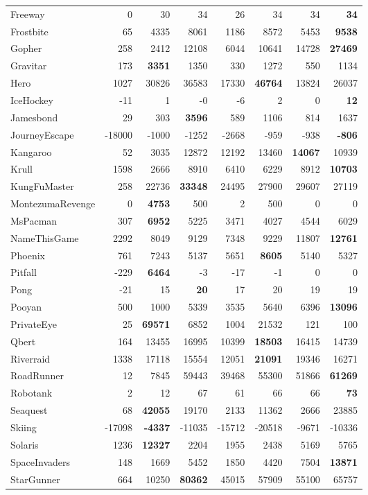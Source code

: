 \documentclass{article}
\begin{document}
\begin{table}
\begin{tabular}{l r r r r r r r}
Freeway&0&30&34&26&34&34&\textbf{34}\\
Frostbite&65&4335&8061&1186&8572&5453&\textbf{9538}\\
Gopher&258&2412&12108&6044&10641&14728&\textbf{27469}\\
Gravitar&173&\textbf{3351}&1350&330&1272&550&1134\\
Hero&1027&30826&36583&17330&\textbf{46764}&13824&26037\\
IceHockey&-11&1&-0&-6&2&0&\textbf{12}\\
Jamesbond&29&303&\textbf{3596}&589&1106&814&1637\\
JourneyEscape&-18000&-1000&-1252&-2668&-959&-938&\textbf{-806}\\
Kangaroo&52&3035&12872&12192&13460&\textbf{14067}&10939\\
Krull&1598&2666&8910&6410&6229&8912&\textbf{10703}\\
KungFuMaster&258&22736&\textbf{33348}&24495&27900&29607&27119\\
MontezumaRevenge&0&\textbf{4753}&500&2&500&0&0\\
MsPacman&307&\textbf{6952}&5225&3471&4027&4544&6029\\
NameThisGame&2292&8049&9129&7348&9229&11807&\textbf{12761}\\
Phoenix&761&7243&5137&5651&\textbf{8605}&5140&5327\\
Pitfall&-229&\textbf{6464}&-3&-17&-1&0&0\\
Pong&-21&15&\textbf{20}&17&20&19&19\\
Pooyan&500&1000&5339&3535&5640&6396&\textbf{13096}\\
PrivateEye&25&\textbf{69571}&6852&1004&21532&121&100\\
Qbert&164&13455&16995&10399&\textbf{18503}&16415&14739\\
Riverraid&1338&17118&15554&12051&\textbf{21091}&19346&16271\\
RoadRunner&12&7845&59443&39468&55300&51866&\textbf{61269}\\
Robotank&2&12&67&61&66&66&\textbf{73}\\
Seaquest&68&\textbf{42055}&19170&2133&11362&2666&23885\\
Skiing&-17098&\textbf{-4337}&-11035&-15712&-20518&-9671&-10336\\
Solaris&1236&\textbf{12327}&2204&1955&2438&5169&5765\\
SpaceInvaders&148&1669&5452&1850&4420&7504&\textbf{13871}\\
StarGunner&664&10250&\textbf{80362}&45015&57909&55100&65757\\

\end{tabular}
\end{table}
\end{document}

